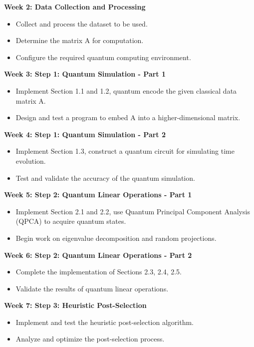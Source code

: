 \documentclass[12pt]{article}
\begin{document}
\textbf{Week 2: Data Collection and Processing}
\begin{itemize}
    \item Collect and process the dataset to be used.
    \item Determine the matrix A for computation.
    \item Configure the required quantum computing environment.
\end{itemize}

\textbf{Week 3: Step 1: Quantum Simulation - Part 1}
\begin{itemize}
    \item Implement Section 1.1 and 1.2, quantum encode the given classical data matrix A.
    \item Design and test a program to embed A into a higher-dimensional matrix.
\end{itemize}

\textbf{Week 4: Step 1: Quantum Simulation - Part 2}
\begin{itemize}
    \item Implement Section 1.3, construct a quantum circuit for simulating time evolution.
    \item Test and validate the accuracy of the quantum simulation.
\end{itemize}

\textbf{Week 5: Step 2: Quantum Linear Operations - Part 1}
\begin{itemize}
    \item Implement Section 2.1 and 2.2, use Quantum Principal Component Analysis (QPCA) to acquire quantum states.
    \item Begin work on eigenvalue decomposition and random projections.
\end{itemize}

\textbf{Week 6: Step 2: Quantum Linear Operations - Part 2}
\begin{itemize}
    \item Complete the implementation of Sections 2.3, 2.4, 2.5.
    \item Validate the results of quantum linear operations.
\end{itemize}

\textbf{Week 7: Step 3: Heuristic Post-Selection}
\begin{itemize}
    \item Implement and test the heuristic post-selection algorithm.
    \item Analyze and optimize the post-selection process.
\end{itemize}
\end{document}
